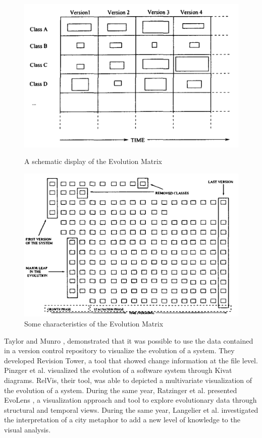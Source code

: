 \begin{figure}[H]
  \includegraphics[width=\linewidth]{EvolutionMatrix1.png}
  \caption{A schematic display of the Evolution Matrix}
\endminipage\hfill
{}
  \includegraphics[width=\linewidth]{EvolutionMatrix2.png}
  \caption{Some characteristics of the Evolution Matrix}
\endminipage\hfill
\end{figure}


Taylor and Munro \cite{Taylor2002},  demonstrated that it was possible to use the data contained in a version control repository to visualize the evolution of a system.
They developed Revision Tower, a tool that showed change information at the file level. 
Pinzger et al. \cite{Pinzger2005} visualized the evolution of a software system through Kivat diagrams.
RelVis, their tool, was able to depicted a multivariate visualization of the evolution of a system.
During the same year, Ratzinger et al. presented EvoLens \cite{Ratzinger2005}, a visualization approach and tool to 
explore evolutionary data through structural and temporal views.  
During the same year, Langelier et al. \cite{Langelier2005} investigated the interpretation of a city metaphor 
\cite{Knight2000} to add a new level of knowledge to the visual analysis.


